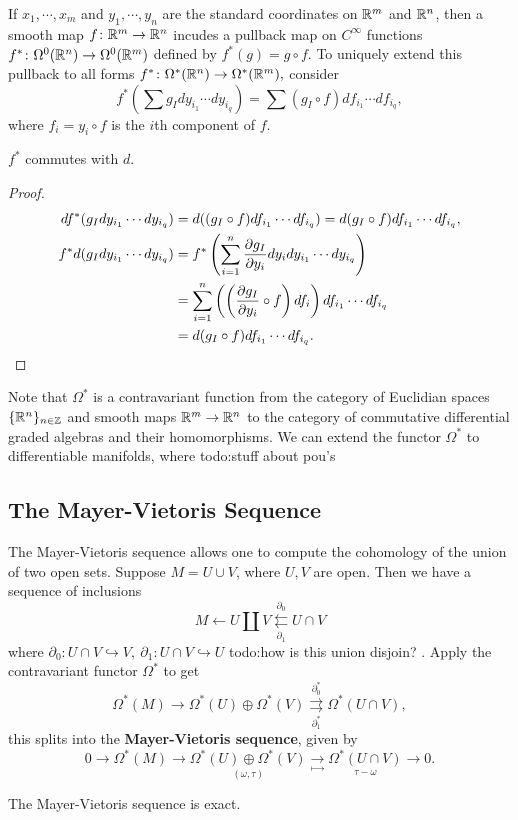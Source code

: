 If $x_1,\cdots ,x_m$ and $y_1,\cdots ,y_n $ are the standard coordinates on $\mathbb{R}^m$ and $\mathbb{R}^n $, then a smooth map $f \colon \mathbb{R}^m \to \mathbb{R}^n $ incudes a pullback map on $C^{\infty}$ functions $f^* \colon \Omega^0(\mathbb{R}^n ) \to \Omega^0(\mathbb{R}^m)$ defined by $f^*(g)=g \circ f$. To uniquely extend this pullback to all forms $f^* \colon \Omega^* (\mathbb{R}^n ) \to \Omega^*(\mathbb{R}^m),$ consider \[
    f^*\left(\sum g_I dy_{i_1}\cdots dy_{i_q}\right)=\sum (g_I \circ f)df_{i_1}\cdots df_{i_q}, 
\] where $f_i =y_i  \circ f$ is the $i$th component of $f$.
\begin{prop}
   $f^*$ commutes with $d$. 
\end{prop}
\begin{proof}
    \begin{align*}
        df^*(g_I dy_{i_1}\cdots dy_{i_q})&=d((g_I \circ f) df_{i_1}\cdots df_{i_q})=d(g_I \circ f)df_{i_1}\cdots df_{i_q},\\
        f^*d(g_I dy _{i_1}\cdots dy_{i_q})&=f^*\left( \sum_{i=1}^{n} \frac{\partial g_I}{\partial y_i }dy_i dy_{i_1}\cdots dy_{i_q} \right) \\
                                          &=\sum_{i=1}^{n} \left( \left( \frac{\partial g_I}{\partial y_i }\circ f \right) df_i  \right) df_{i_1}\cdots df_{i_q}\\
                                          &=d(g_I \circ f)df_{i_1}\cdots df_{i_q}.\qedhere
    \end{align*}
\end{proof}
Note that $\Omega^*$ is a contravariant function from the category of Euclidian spaces $\{\mathbb{R}^n \} _{n\in \mathbb{Z}}$ and smooth maps $\mathbb{R}^m \to \mathbb{R}^n $ to the category of commutative differential graded algebras and their homomorphisms. We can extend the functor $\Omega^*$ to differentiable manifolds, where {\color{red}todo:stuff about pou's} 

\subsection{The Mayer-Vietoris Sequence}
The Mayer-Vietoris sequence allows one to compute the cohomology of the union of two open sets. Suppose $M=U \cup V$, where $U,V$ are open. Then we have a sequence of inclusions \[
M \leftarrow U \amalg V \underset{\partial_1 }{\overset{\partial_0}{\leftleftarrows}}  U \cap V
\] where $\partial_0 \colon U\cap V \hookrightarrow V,\ \partial_1 \colon U\cap V\hookrightarrow U$ {\color{red}todo:how is this union disjoin?} . Apply the contravariant functor $\Omega^*$ to get \[
\Omega^*(M) \to \Omega^*(U)\oplus \Omega^*(V) \underset{\partial_1^* }{\overset{\partial_0^* }{\rightrightarrows}}  \Omega^*(U \cap V),
\] this splits into the \textbf{Mayer-Vietoris sequence}, given by \[
0 \longrightarrow\Omega^*(M) \longrightarrow\underset{(\omega,\tau)}{\Omega^*(U) \oplus \Omega^*(V)} \underset{\mapsto }{\longrightarrow}  \underset{\tau - \omega}{\Omega^*(U \cap V)} \longrightarrow 0.
\] 
\begin{prop}
    The Mayer-Vietoris sequence is exact.
\end{prop}
